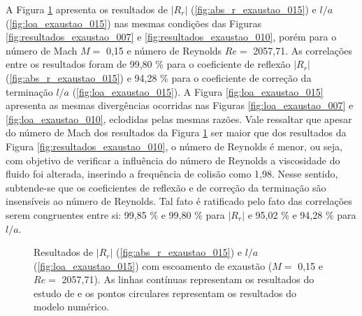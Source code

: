 A Figura \ref{fig:resultados_exaustao_015} apresenta os resultados de $|R_{r}|$ (\ref{fig:abs_r_exaustao_015}) e  $l/a$ (\ref{fig:loa_exaustao_015}) nas mesmas condições das Figuras \ref{fig:resultados_exaustao_007} e \ref{fig:resultados_exaustao_010}, porém para o número de Mach $M =$ 0,15 e número de Reynolds $Re =$ 2057,71.  As correlações entre os resultados foram de 99,80 \% para o coeficiente de reflexão $|R_{r}|$ (\ref{fig:abs_r_exaustao_015}) e 94,28 \% para o coeficiente de correção da terminação $l/a$ (\ref{fig:loa_exaustao_015}). A Figura \ref{fig:loa_exaustao_015} apresenta as mesmas divergências ocorridas nas Figuras \ref{fig:loa_exaustao_007} e \ref{fig:loa_exaustao_010}, eclodidas pelas mesmas razões. Vale ressaltar que apesar do número de Mach dos resultados da Figura \ref{fig:resultados_exaustao_015} ser maior que dos resultados da Figura \ref{fig:resultados_exaustao_010}, o número de Reynolds é menor, ou seja, com objetivo de verificar a influência do número de Reynolds a viscosidade do fluido foi alterada, inserindo a frequência de colisão como 1,98. Nesse sentido, subtende-se que os coeficientes de reflexão e de correção da terminação são insensíveis ao número de Reynolds. Tal fato é ratificado pelo fato das correlações serem congruentes entre si: 99,85 \% e 99,80 \% para $|R_{r}|$ e 95,02 \% e 94,28 \% para $l/a$.

\begin{figure}[ht!]
\begin{subfigure}{\scaleA \textwidth}
  
\end{subfigure}%
\begin{subfigure}{\scaleA \textwidth}
  
\end{subfigure}
\caption[Resultados de $|R_{r}|$ e $l/a$ com escoamento de exaustão (M $=$ 0,15 e Re $=$ 2057,71)]{Resultados de $|R_{r}|$ (\ref{fig:abs_r_exaustao_015}) e $l/a$ (\ref{fig:loa_exaustao_015}) com escoamento de exaustão ($M =$ 0,15 e $Re =$ 2057,71). As linhas contínuas representam os resultados do estudo de  e os pontos circulares representam os resultados do modelo numérico.}
\label{fig:resultados_exaustao_015}
\end{figure}


